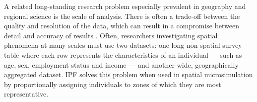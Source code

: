 \documentclass[a4paper,10pt]{article}
\begin{document}
A related long-standing research problem especially prevalent in geography and regional science
is the scale of analysis. There is often a trade-off between the quality and resolution 
of the data, which can result in a compromise between detail and accuracy of results 
\citep{ballas2003microsimulation-30-years}. Often, researchers investigating 
spatial phenomena at many scales must use two datasets: one long non-spatial
survey table where each row represents the characteristics of an individual --- such as
age, sex, employment status and income --- and another wide, geographically aggregated 
dataset. IPF solves this problem when used in
spatial microsimulation by proportionally assigning individuals to zones of which they
are most representative.

\end{document}
